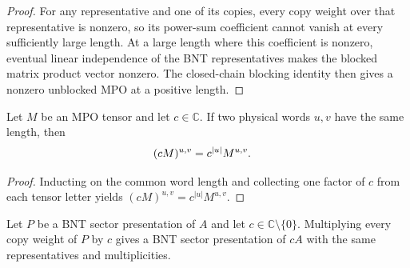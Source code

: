 \begin{proof}\leanok
    For any representative and one of its copies, every copy weight over that
    representative is nonzero, so its power-sum coefficient cannot vanish at
    every sufficiently large length. At a large length where this coefficient
    is nonzero, eventual
    linear independence of the BNT representatives makes the blocked matrix
    product vector nonzero. The closed-chain blocking identity then gives a
    nonzero unblocked MPO at a positive length.
\end{proof}

\begin{lemma}
    \label{lem:mpdo_eval_word_scalar_scaling}
    \leanok
    Let $M$ be an MPO tensor and let $c\in\mathbb C$. If two physical words
    $u,v$ have the same length, then
    \begin{align}
        (cM)^{u,v} & =c^{|u|}M^{u,v}.
        \notag
    \end{align}
\end{lemma}

\begin{proof}\leanok
    Inducting on the common word length and collecting one factor of $c$ from
    each tensor letter yields $(cM)^{u,v}=c^{|u|}M^{u,v}$.
\end{proof}

\begin{lemma}
    \label{thm:mpdo_cpsv_bnt_scalar_scaling}
    \leanok
    Let $P$ be a BNT sector presentation of $A$ and let
    $c\in\mathbb C\setminus\{0\}$. Multiplying every copy weight of $P$ by
    $c$ gives a BNT sector presentation of $cA$ with the same
    representatives and multiplicities.
\end{lemma}

